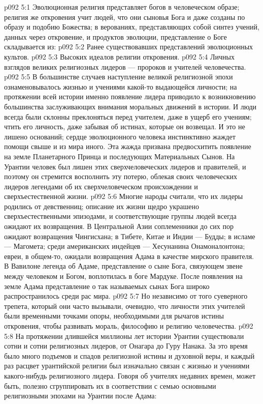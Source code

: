 \vs p092 5:1 Эволюционная религия представляет богов в человеческом образе; религия же откровения учит людей, что они сыновья Бога и даже созданы по образу и подобию Божества; в верованиях, представляющих собой синтез учений, данных через откровение, и продуктов эволюции, представление о Боге складывается из:
\vs p092 5:2 \bibnobreakspace Ранее существовавших представлений эволюционных культов.
\vs p092 5:3 \bibnobreakspace Высоких идеалов религии откровения.
\vs p092 5:4 \bibnobreakspace Личных взглядов великих религиозных лидеров --- пророков и учителей человечества.
\vs p092 5:5 \pc В большинстве случаев наступление великой религиозной эпохи ознаменовывалось жизнью и учениями какой\hyp{}то выдающейся личности; на протяжении всей истории именно появление лидера приводило к возникновению большинства заслуживающих внимания моральных движений в истории. И люди всегда были склонны преклоняться перед учителем, даже в ущерб его учениям; чтить его личность, даже забывая об истинах, которые он возвещал. И это не лишено оснований; сердце эволюционного человека инстинктивно жаждет помощи свыше и из мира иного. Эта жажда призвана предвосхитить появление на земле Планетарного Принца и последующих Материальных Сынов. На Урантии человек был лишен этих сверхчеловеческих лидеров и правителей, и поэтому он стремится восполнить эту потерю, облекая своих человеческих лидеров легендами об их сверхчеловеческом происхождении и сверхъестественной жизни.
\vs p092 5:6 Многие народы считали, что их лидеры родились от девственниц; описание их жизни щедро украшено сверхъестественными эпизодами, и соответствующие группы людей всегда ожидают их возвращения. В Центральной Азии соплеменники до сих пор ожидают возвращения Чингисхана; в Тибете, Китае и Индии --- Будды; в исламе --- Магомета; среди американских индейцев --- Хесунанина Онамоналонтона; евреи, в общем\hyp{}то, ожидали возвращения Адама в качестве мирского правителя. В Вавилоне легенда об Адаме, представление о сыне Бога, связующем звене между человеком и Богом, воплотилась в боге Мардуке. После появления на земле Адама представление о так называемых сынах Бога широко распространилось среди рас мира.
\vs p092 5:7 Но независимо от того суеверного трепета, который они часто вызывали, очевидно, что личности этих учителей были временными точками опоры, необходимыми для рычагов истины откровения, чтобы развивать мораль, философию и религию человечества.
\vs p092 5:8 На протяжении длившейся миллионы лет истории Урантии существовали сотни и сотни религиозных лидеров, от Онагара до Гуру Нанака. За это время было много подъемов и спадов религиозной истины и духовной веры, и каждый раз расцвет урантийской религии был изначально связан с жизнью и учениями какого\hyp{}нибудь религиозного лидера. Говоря об учителях недавних времен, может быть, полезно сгруппировать их в соответствии с семью основными религиозными эпохами на Урантии после Адама:
